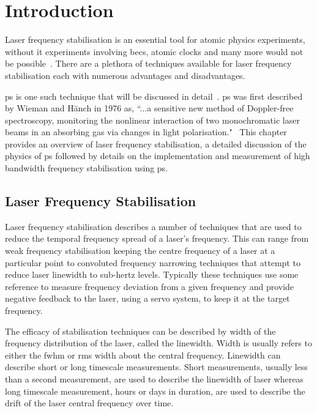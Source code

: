 \chapter{Introduction}

Laser frequency stabilisation is an essential tool for atomic physics experiments, without it experiments involving \glspl{bec}, atomic clocks and many more would not be possible~\cite{anderson_observation_1995,ye_quantum_2008}.
There are a plethora of techniques available for laser frequency stabilisation each with numerous advantages and disadvantages.

\Gls{ps} is one such technique that will be discussed in detail~\cite{demtroder_laser_2003}.
\Gls{ps} was first described by Wieman and H\"anch in 1976 as, ``...a sensitive new method of Doppler-free spectroscopy, monitoring the nonlinear interaction of two monochromatic laser beams in an absorbing gas via changes in light polarisation."~\cite{wieman_doppler-free_1976}
This chapter provides an overview of laser frequency stabilisation, a detailed discussion of the physics of \gls{ps} followed by details on the implementation and measurement of high bandwidth frequency stabilisation using \gls{ps}.

\section{Laser Frequency Stabilisation}

Laser frequency stabilisation describes a number of techniques that are used to reduce the temporal frequency spread of a laser's frequency.
This can range from weak frequency stabilisation keeping the centre frequency of a laser at a particular point to convoluted frequency narrowing techniques that attempt to reduce laser linewidth to sub-hertz levels.
Typically these techniques use some reference to measure frequency deviation from a given frequency and provide negative feedback to the laser, using a servo system, to keep it at the target frequency.

The efficacy of stabilisation techniques can be described by width of the frequency distribution of the laser, called the linewidth.
Width is usually refers to either the \gls{fwhm} or \gls{rms} width about the central frequency.
Linewidth can describe short or long timescale measurements.
Short measurements, usually less than a second measurement, are used to describe the linewidth of laser whereas long timescale measurement, hours or days in duration, are used to describe the drift of the laser central frequency over time.

